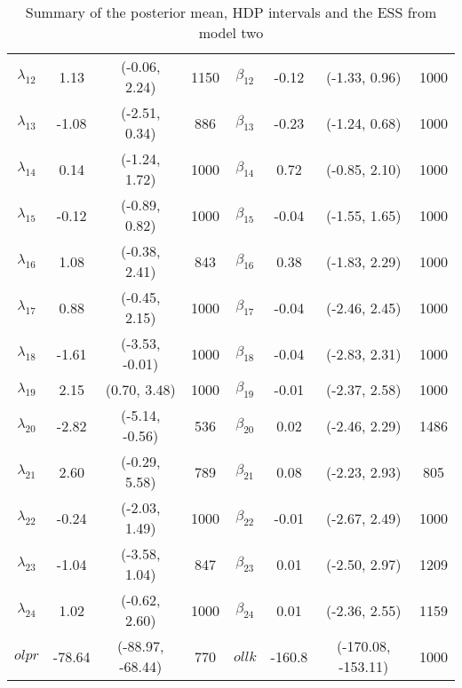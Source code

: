 \begin{table}[htb]
\begin{tabular}{cccc|cccc}
$\lambda_{12}$ & 1.13 & (-0.06, 2.24) & 1150 &
$\beta_{12}$ & -0.12 & (-1.33, 0.96) & 1000\\

$\lambda_{13}$ & -1.08 & (-2.51, 0.34) & 886 &
$\beta_{13}$ & -0.23 & (-1.24, 0.68) & 1000\\

$\lambda_{14}$ & 0.14 & (-1.24, 1.72) & 1000 &
$\beta_{14}$ & 0.72 & (-0.85, 2.10) & 1000\\

$\lambda_{15}$ & -0.12 & (-0.89, 0.82) & 1000 &
$\beta_{15}$ & -0.04 & (-1.55, 1.65) & 1000\\

$\lambda_{16}$ & 1.08 & (-0.38, 2.41) & 843 &
$\beta_{16}$ & 0.38 & (-1.83, 2.29) & 1000\\

$\lambda_{17}$ & 0.88 & (-0.45, 2.15) & 1000 &
$\beta_{17}$ & -0.04 & (-2.46, 2.45) & 1000\\

$\lambda_{18}$ & -1.61 & (-3.53, -0.01) & 1000 &
$\beta_{18}$ & -0.04 & (-2.83, 2.31) & 1000\\

$\lambda_{19}$ & 2.15 & (0.70, 3.48) & 1000 &
$\beta_{19}$ & -0.01 & (-2.37, 2.58) & 1000\\

$\lambda_{20}$ & -2.82 & (-5.14, -0.56) & 536 &
$\beta_{20}$ & 0.02 & (-2.46, 2.29) & 1486\\

$\lambda_{21}$ & 2.60 & (-0.29, 5.58) & 789 &
$\beta_{21}$ & 0.08 & (-2.23, 2.93) & 805\\

$\lambda_{22}$ & -0.24 & (-2.03, 1.49) & 1000 &
$\beta_{22}$ & -0.01 & (-2.67, 2.49) & 1000\\

$\lambda_{23}$ & -1.04 & (-3.58, 1.04) & 847 &
$\beta_{23}$ & 0.01 & (-2.50, 2.97) & 1209\\

$\lambda_{24}$ & 1.02 & (-0.62, 2.60) & 1000 &
$\beta_{24}$ & 0.01 & (-2.36, 2.55) & 1159\\

$olpr$ & -78.64 & (-88.97, -68.44) & 770 &
$ollk$ & -160.8 & (-170.08, -153.11) & 1000\\
\end{tabular}
\caption{Summary of the posterior mean, HDP intervals and the ESS from model two}
\end{table}
